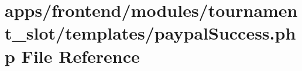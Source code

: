 \hypertarget{frontend_2modules_2tournament__slot_2templates_2paypal_success_8php}{\section{apps/frontend/modules/tournament\-\_\-slot/templates/paypal\-Success.php File Reference}
\label{frontend_2modules_2tournament__slot_2templates_2paypal_success_8php}
}
